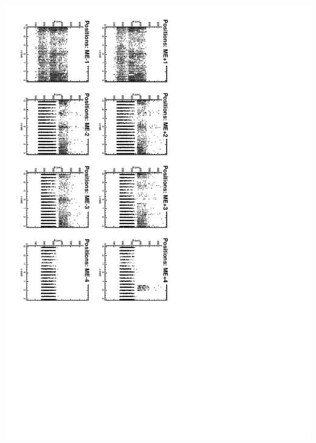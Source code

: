 \documentclass[compress]{beamer}
\begin{document}
\begin{frame}
\vfill
\includegraphics[height=\linewidth, angle=90]{positions2.pdf}
\end{frame}
\end{document}

